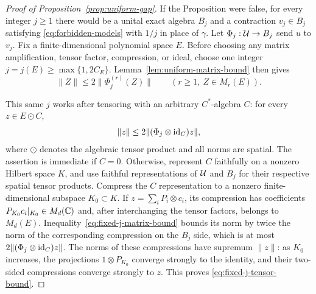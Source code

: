 \begin{proof}[Proof of Proposition~\ref{prop:uniform-gap}]
If the Proposition were false, for every integer $j\geq1$ there
would be a unital exact algebra $B_j$ and a contraction $v_j\in B_j$
satisfying \eqref{eq:forbidden-models} with $1/j$ in place of $\gamma$.
Let $\Phi_j:\mathcal U\to B_j$ send $u$ to $v_j$.
Fix a finite-dimensional polynomial space $E$.  Before choosing any
matrix amplification, tensor factor, compression, or ideal, choose one
integer $j=j(E)\geq\max\{1,2C_E\}$.  Lemma~\ref{lem:uniform-matrix-bound}
then gives
\begin{equation}\label{eq:fixed-j-matrix-bound}
 \|Z\|\leq2\|\Phi_j^{(r)}(Z)\|
 \qquad(r\geq1,\ Z\in M_r(E)).
\end{equation}

This same $j$ works after tensoring with an arbitrary $C^*$-algebra
$C$: for every $z\in E\odot C$,
\begin{equation}\label{eq:fixed-j-tensor-bound}
 \|z\|\leq2\|(\Phi_j\otimes\operatorname{id}_C)z\|,
\end{equation}
where $\odot$ denotes the algebraic tensor product and all norms are
spatial.  The assertion is immediate if $C=0$.  Otherwise, represent
$C$ faithfully on a nonzero Hilbert space $K$, and use
faithful representations of $\mathcal U$ and $B_j$ for their respective
spatial tensor products.  Compress the $C$ representation to a
nonzero finite-dimensional subspace $K_0\subset K$.  If
$z=\sum_i P_i\otimes c_i$, its compression has coefficients
$P_{K_0}c_i|_{K_0}\in M_d(\mathbb C)$ and, after interchanging the tensor
factors, belongs to $M_d(E)$.  Inequality~\eqref{eq:fixed-j-matrix-bound}
bounds its norm by twice the norm of the corresponding compression
on the $B_j$ side, which is at most
$2\|(\Phi_j\otimes\operatorname{id}_C)z\|$.  The norms of these compressions
have supremum $\|z\|$: as $K_0$ increases, the projections
$1\otimes P_{K_0}$ converge strongly to the identity, and their
two-sided compressions converge strongly to $z$.  This proves
\eqref{eq:fixed-j-tensor-bound}.


\end{proof}

